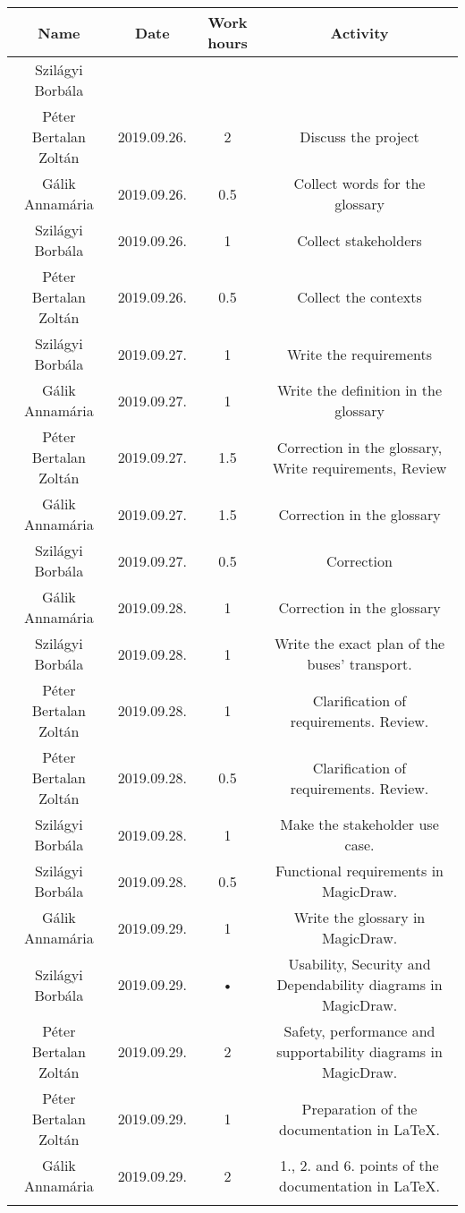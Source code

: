 \documentclass[a4paper]{article}
\begin{document}
\begin{tabular}{|c|c|c|c|}
\hline 
\textbf{Name} & \textbf{Date} & \textbf{Work hours} & \textbf{Activity} \\ 
\hline 
Szilágyi Borbála \\ Péter Bertalan Zoltán & 2019.09.26. & 2 & Discuss the project \\ 
\hline
Gálik Annamária & 2019.09.26. & 0.5 & Collect words for the glossary \\ 
\hline 
Szilágyi Borbála & 2019.09.26. & 1 & Collect stakeholders \\ 
\hline 
Péter Bertalan Zoltán & 2019.09.26. & 0.5 & Collect the contexts \\ 
\hline 
Szilágyi Borbála & 2019.09.27. & 1 & Write the requirements \\ 
\hline 
Gálik Annamária & 2019.09.27. & 1 & Write the definition in the glossary \\ 
\hline 
Péter Bertalan Zoltán & 2019.09.27. & 1.5 & Correction in the glossary, Write requirements, Review \\ 
\hline 
Gálik Annamária & 2019.09.27. & 1.5 & Correction in the glossary \\ 
\hline 
Szilágyi Borbála & 2019.09.27. & 0.5 & Correction  \\ 
\hline 
Gálik Annamária & 2019.09.28. & 1 &  Correction in the glossary  \\ 
\hline 
Szilágyi Borbála & 2019.09.28. & 1 &  Write the exact plan of the buses' transport.\\ 
\hline 
Péter Bertalan Zoltán & 2019.09.28. & 1 & Clarification of requirements. Review. \\ 
\hline 
Péter Bertalan Zoltán & 2019.09.28. & 0.5 & Clarification of requirements. Review. \\ 
\hline 
Szilágyi Borbála & 2019.09.28. & 1 &  Make the stakeholder use case. \\ 
\hline 
Szilágyi Borbála & 2019.09.28. & 0.5 & Functional requirements in MagicDraw. \\ 
\hline 
Gálik Annamária & 2019.09.29. & 1 & Write the glossary in MagicDraw. \\ 
\hline 
Szilágyi Borbála & 2019.09.29. & • & Usability, Security and Dependability diagrams in MagicDraw. \\ 
\hline 
Péter Bertalan Zoltán & 2019.09.29. & 2 &  Safety, performance and supportability diagrams in MagicDraw. \\ 
\hline 
Péter Bertalan Zoltán & 2019.09.29. & 1 & Preparation of the documentation in LaTeX. \\ 
\hline 
Gálik Annamária & 2019.09.29. & 2 & 1., 2. and 6. points of the documentation in LaTeX. \\ 
\hline \\
\end{tabular} 
\clearpage
\printglossaries
\end{document}
